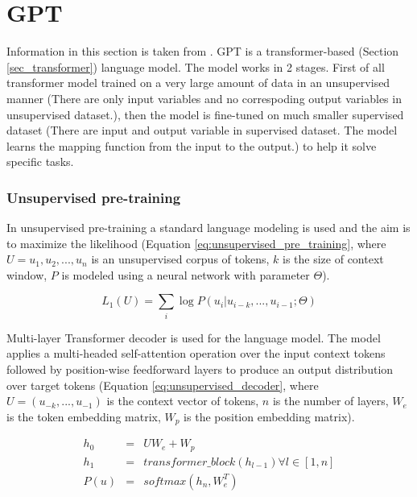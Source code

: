 \section{GPT} \label{sec_gpt}
Information in this section is taken from \cite{radford2018improving}.
GPT is a transformer-based (Section \ref{sec_transformer}) language model. The model works in 2 stages. First of all transformer model trained on a very large amount of data in an unsupervised manner (There are only input variables and no correspoding output variables in unsupervised dataset.), then the model is fine-tuned on much smaller supervised dataset (There are input and output variable in supervised dataset. The model learns the mapping function from the input to the output.) to help it solve specific tasks.

\subsubsection{Unsupervised pre-training}
In unsupervised pre-training a standard language modeling is used and the aim is to maximize the likelihood (Equation \ref{eq:unsupervised_pre_training}, where $U = {u_1, u_2, ... , u_n}$ is an unsupervised corpus of tokens, $k$ is the size of context window, $P$ is modeled using a neural network with parameter $\Theta$).

\begin{equation} \label{eq:unsupervised_pre_training}
L_1(U) = \sum_i \log P(u_i|u_{i-k}, ... , u_{i-1}; \Theta)
\end{equation}

Multi-layer Transformer decoder is used for the language model. The model applies a multi-headed self-attention operation over the input context tokens followed by position-wise feedforward layers to produce an output distribution
over target tokens (Equation \ref{eq:unsupervised_decoder}, where $U = (u_{-k}, ... , u_{-1})$ is the context vector of tokens, $n$ is the number of layers, $W_e$ is the token embedding matrix, $W_p$ is the position embedding matrix).

\begin{equation}  \label{eq:unsupervised_decoder}
\begin{array}{lcl} 
h_0 & = &UW_e + W_p \\

h_1 & = & transformer\_block(h_{l-1}) \forall l \in [1,n] \\

P(u) & = & softmax(h_n, W_e^T) \\
\end{array}
\end{equation}

